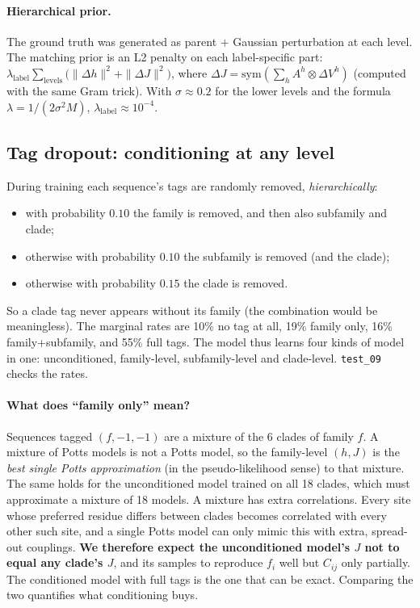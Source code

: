 \paragraph{Hierarchical prior.} The ground truth was generated as parent $+$ Gaussian perturbation at each
level. The matching prior is an L2 penalty on each label-specific part:
$\lambda_{\text{label}}\sum_{\text{levels}}\big(\|\Delta h\|^2+\|\Delta J\|^2\big)$, where $\Delta J=\mathrm{sym}(\sum_hA^h\otimes\Delta V^h)$
(computed with the same Gram trick). With $\sigma\approx0.2$ for the lower levels and the formula
$\lambda=1/(2\sigma^2M)$, $\lambda_{\text{label}}\approx10^{-4}$.

\subsection{Tag dropout: conditioning at any level}
During training each sequence's tags are randomly removed, \emph{hierarchically}:
\begin{itemize}[nosep]
  \item with probability $0.10$ the family is removed, and then also subfamily and clade;
  \item otherwise with probability $0.10$ the subfamily is removed (and the clade);
  \item otherwise with probability $0.15$ the clade is removed.
\end{itemize}
So a clade tag never appears without its family (the combination would be meaningless). The marginal
rates are 10\% no tag at all, 19\% family only, 16\% family+subfamily, and 55\% full tags. The model thus
learns four kinds of model in one: unconditioned, family-level, subfamily-level and clade-level.
\texttt{test\_09} checks the rates.

\paragraph{What does ``family only'' mean?} Sequences tagged $(f,-1,-1)$ are a mixture of the 6 clades of
family $f$. A mixture of Potts models is not a Potts model, so the family-level $(h,J)$ is the
\emph{best single Potts approximation} (in the pseudo-likelihood sense) to that mixture. The same holds for
the unconditioned model trained on all 18 clades, which must approximate a mixture of 18 models. A mixture
has extra correlations. Every site whose preferred residue differs between clades becomes correlated with
every other such site, and a single Potts model can only mimic this with extra, spread-out couplings.
\textbf{We therefore expect the unconditioned model's $J$ not to equal any clade's $J$}, and its samples to
reproduce $f_i$ well but $C_{ij}$ only partially. The conditioned model with full tags is the one that can
be exact. Comparing the two quantifies what conditioning buys.

